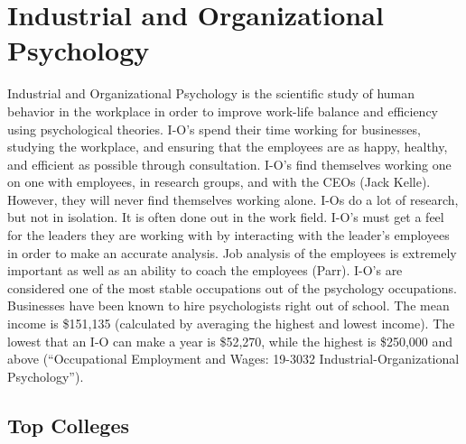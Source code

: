 \chapter{Industrial and Organizational Psychology}
\begin{multicols}{2}

Industrial and Organizational Psychology is the scientific study of human behavior in the workplace in order to improve work-life balance and efficiency using psychological theories. I-O’s spend their time working for businesses, studying the workplace, and ensuring that the employees are as happy, healthy, and efficient as possible through consultation. I-O’s find themselves working one on one with employees, in research groups, and with the CEOs (Jack Kelle). However, they will never find themselves working alone. I-Os do a lot of research, but not in isolation. It is often done out in the work field. I-O’s must get a feel for the leaders they are working with by interacting with the leader's employees in order to make an accurate analysis. Job analysis of the employees is extremely important as well as an ability to coach the employees (Parr). I-O’s are considered one of the most stable occupations out of the psychology occupations. Businesses have been known to hire psychologists right out of school. The mean income is \$151,135 (calculated by averaging the highest and lowest income). The lowest that an I-O can make a year is \$52,270, while the highest is \$250,000 and above (“Occupational Employment and Wages: 19-3032 Industrial-Organizational Psychology”). 

\end{multicols}

\section{Top Colleges}

